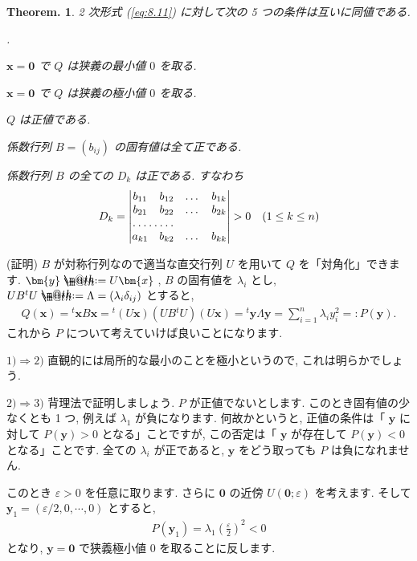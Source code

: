 \documentclass[openany, a4paper, oneside]{book}
\makeatletter
\newcounter{enum2}
\renewenvironment{enumerate}{%
\begin{list}%
{%
\arabic{enum2}.\ \,%
}%
{%
\usecounter{enum2}
\setlength{\itemindent}{0pt}%
\setlength{\leftmargin}{6pt}%
\setlength{\rightmargin}{0pt}%
\setlength{\labelsep}{0pt}%
\setlength{\labelwidth}{6pt}%
\setlength{\itemsep}{0pt}%
\setlength{\parsep}{0pt}%
\setlength{\listparindent}{0pt}%
}
}{%
\end{list}%
}
\newcommand*{\defeq}{\mathrel{\rlap{%
\raisebox{0.3ex}{$\m@th\cdot$}}%
\raisebox{-0.3ex}{$\m@th\cdot$}}%
=}
\theoremstyle{break}
\newtheorem{thm}{Theorem.}[section]
\theoremstyle{breakdefn}
\newcommand{\vep}{\varepsilon}
\makeatother
\begin{document}
\begin{thm}
2 次形式 (\ref{eq:8.11}) に対して次の 5 つの条件は互いに同値である.
\begin{enumerate}
\item[1)] $\bm{x} = \bm{0}$ で $Q$ は狭義の最小値 $0$ を取る.
\item[2)] $\bm{x} = \bm{0}$ で $Q$ は狭義の極小値 $0$ を取る.
\item[3)] $Q$ は正値である.
\item[4)] 係数行列 $B = (b_{ij})$ の固有値は全て正である.
\item[5)] 係数行列 $B$ の全ての $D_k$ は正である. すなわち
\begin{align}
D_k
=
\begin{vmatrix}
b_{11} & b_{12} & \dots & b_{1k} \\
b_{21} & b_{22} & \dots & b_{2k} \\
\hdotsfor{2} \\
a_{k1} & b_{k2} & \dots & b_{kk}
\end{vmatrix}
>
0 \quad (1 \leq k \leq n )
\end{align}
\end{enumerate}
\end{thm}
(証明)
$B$ が対称行列なので適当な直交行列 $U$ を用いて $Q$ を「対角化」できます.
$\bm{y} \defeq U\bm{x}$ ,
$B$ の固有値を $\lambda_i$ とし,
$UB {^t} U \defeq \Lambda = ( \lambda_i \delta_{ij} )$ とすると,
\begin{align}
Q ( \bm{x} )
=
{^t} \bm{x} B \bm{x}
=
{^t} ( U \bm{x} ) ( U B {^t} U ) ( U \bm{x} )
=
{^t} \bm{y} \Lambda \bm{y}
=
\sum_{i=1}^n \lambda_i y_i^2
=:
P ( \bm{y} ).
\end{align}
これから $P$ について考えていけば良いことになります.

$1)\Rightarrow 2)$
直観的には局所的な最小のことを極小というので, これは明らかでしょう.

$2)\Rightarrow 3)$
背理法で証明しましょう.
$P$ が正値でないとします. このとき固有値の少なくとも 1 つ, 例えば $\lambda_1$ が負になります.
何故かというと, 正値の条件は「 $\bm{y}$ に対して $P (\bm{y})>0$ となる」ことですが,
この否定は「 $\bm{y}$ が存在して $P (\bm{y})<0$ となる」ことです.
全ての $\lambda_i$ が正であると,  $\bm{y}$ をどう取っても $P$ は負になれません.

このとき $\vep>0$ を任意に取ります. さらに $\bm{0}$ の近傍 $U (\bm{0};\vep)$ を考えます.
そして $\bm{y}_1 = ( \vep/2 , 0 , \dotsb , 0 )$ とすると,
\begin{align}
P ( \bm{y}_1 )
=
\lambda_1  \left ( \frac{\vep} {2} \right) ^2
<
0
\end{align}
となり,  $\bm{y}=\bm{0}$ で狭義極小値 $0$ を取ることに反します.
\end{document}
